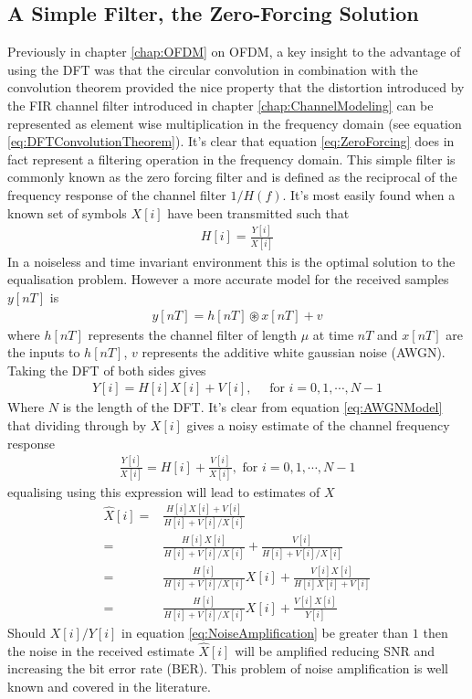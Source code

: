 \subsection{A Simple Filter, the Zero-Forcing Solution}
\label{subsec:ZeroForcing}
Previously in chapter \ref{chap:OFDM} on OFDM, a key insight to %
the advantage of using the DFT was that the circular convolution %
in combination with the convolution theorem provided the nice %
property that the distortion introduced by the FIR channel filter %
introduced in chapter \ref{chap:ChannelModeling} can be represented %
as element wise multiplication in the frequency domain (see equation %
\ref{eq:DFTConvolutionTheorem}). It's clear that equation %
\ref{eq:ZeroForcing} does in fact represent a filtering operation %
in the frequency domain. This simple filter is commonly known as %
the zero forcing filter and is defined as the reciprocal of the %
frequency response of the channel filter $1/H(f)$. %
It's most easily found when a known set of symbols $X[i]$ have %
been transmitted such that
\begin{align}
	H\left[i\right] = \frac{Y\left[i\right]}{X\left[i\right]}
\end{align}
In a noiseless and time invariant environment this is the optimal %
solution to the equalisation problem. However a more accurate %
model for the received samples $y[nT]$ is
\begin{align}
	y[nT]=h[nT]\circledast x[nT]%
	+ v
\end{align}
where $h[nT]$ represents the channel filter of length %
$\mu$ at time $nT$ and $x[nT]$ are the inputs to %
$h[nT]$, $v$ represents the additive white gaussian %
noise (AWGN). Taking the DFT of both sides gives %
\begin{align}
	Y[i] = H[i]X[i] + V[i]%
	,\quad \text{ for } i = 0,1,\cdots,N-1
	\label{eq:AWGNModel}
\end{align}
Where $N$ is the length of the DFT. It's clear from %
equation \ref{eq:AWGNModel} that dividing through %
by $X[i]$ gives a noisy estimate of the channel %
frequency response
\begin{align}
	\frac{Y[i]}{X[i]} = H[i] + \frac{V[i]}{X[i]}, %
	\text{ for } i = 0,1,\cdots,N-1
\end{align}
equalising using this expression will lead to estimates %
of $X$
\begin{align}
	\hat{X}[i] =& \frac{H[i]X[i]+V[i]}{H[i]+V[i]/X[i]} \\
	=& \frac{H[i]X[i]}{H[i]+V[i]/X[i]} + \frac{V[i]}{H[i]
	+ V[i]/X[i]} \\
	=& \frac{H[i]}{H[i]+V[i]/X[i]}X[i] + 
	\frac{V[i]X[i]}{H[i]X[i]+V[i]}\\
	=& \frac{H[i]}{H[i]+V[i]/X[i]}X[i] + 
	\frac{V[i]X[i]}{Y[i]}
	\label{eq:NoiseAmplification}
\end{align}
Should $X[i]/Y[i]$ in equation \ref{eq:NoiseAmplification} %
be greater than $1$ then the noise in the received estimate %
$\hat{X}[i]$ will be amplified reducing SNR and increasing the bit %
error rate (BER). This problem of noise amplification is well %
known and covered in the literature. %


